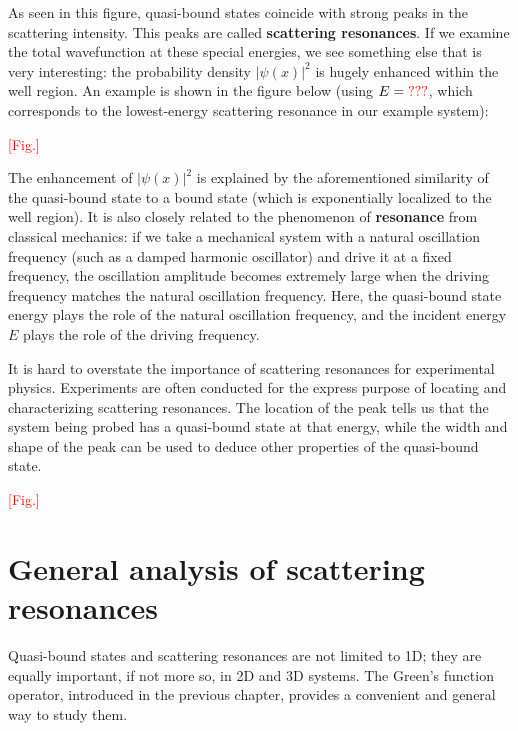 \documentclass[pra,12pt]{revtex4}
\begin{document}
As seen in this figure, quasi-bound states coincide with strong peaks
in the scattering intensity.  This peaks are called \textbf{scattering
  resonances}.  If we examine the total wavefunction at these special
energies, we see something else that is very interesting: the
probability density $|\psi(x)|^2$ is hugely enhanced within the well
region.  An example is shown in the figure below (using $E =
\textcolor{red}{???}$, which corresponds to the lowest-energy
scattering resonance in our example system):

\textcolor{red}{[Fig.]}

The enhancement of $|\psi(x)|^2$ is explained by the aforementioned
similarity of the quasi-bound state to a bound state (which is
exponentially localized to the well region).  It is also closely
related to the phenomenon of \textbf{resonance} from classical
mechanics: if we take a mechanical system with a natural oscillation
frequency (such as a damped harmonic oscillator) and drive it at a
fixed frequency, the oscillation amplitude becomes extremely large
when the driving frequency matches the natural oscillation frequency.
Here, the quasi-bound state energy plays the role of the natural
oscillation frequency, and the incident energy $E$ plays the role of
the driving frequency.

It is hard to overstate the importance of scattering resonances for
experimental physics.  Experiments are often conducted for the express
purpose of locating and characterizing scattering resonances.  The
location of the peak tells us that the system being probed has a
quasi-bound state at that energy, while the width and shape of the
peak can be used to deduce other properties of the quasi-bound state.


\textcolor{red}{[Fig.]}


\section{General analysis of scattering resonances}

Quasi-bound states and scattering resonances are not limited to 1D;
they are equally important, if not more so, in 2D and 3D systems.  The
Green's function operator, introduced in the previous chapter,
provides a convenient and general way to study them.
\end{document}
